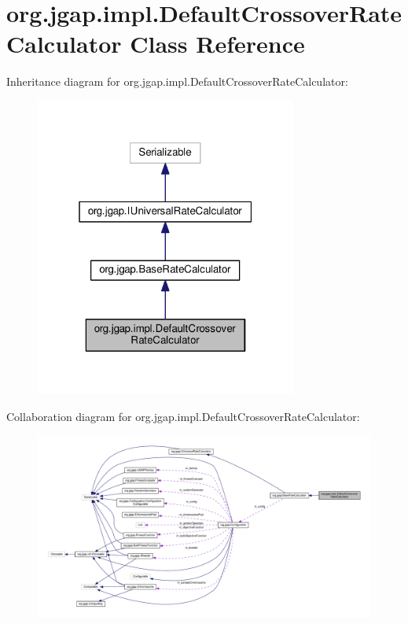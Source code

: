 \hypertarget{classorg_1_1jgap_1_1impl_1_1_default_crossover_rate_calculator}{\section{org.\-jgap.\-impl.\-Default\-Crossover\-Rate\-Calculator Class Reference}
\label{classorg_1_1jgap_1_1impl_1_1_default_crossover_rate_calculator}
}


Inheritance diagram for org.\-jgap.\-impl.\-Default\-Crossover\-Rate\-Calculator\-:
\nopagebreak
\begin{figure}[H]
\begin{center}
\leavevmode
\includegraphics[width=244pt]{classorg_1_1jgap_1_1impl_1_1_default_crossover_rate_calculator__inherit__graph}
\end{center}
\end{figure}


Collaboration diagram for org.\-jgap.\-impl.\-Default\-Crossover\-Rate\-Calculator\-:
\nopagebreak
\begin{figure}[H]
\begin{center}
\leavevmode
\includegraphics[width=350pt]{classorg_1_1jgap_1_1impl_1_1_default_crossover_rate_calculator__coll__graph}
\end{center}
\end{figure}
